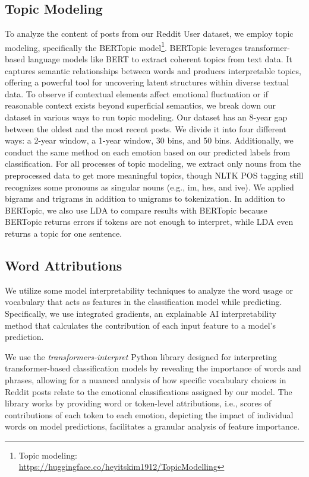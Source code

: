 \documentclass[conference,compsoc]{IEEEtran}
\begin{document}
\subsection{Topic Modeling}
To analyze the content of posts from our Reddit User dataset, we employ topic modeling, specifically the BERTopic model\footnote{Topic modeling: \\\url{https://huggingface.co/heyitskim1912/TopicModelling}}. BERTopic leverages transformer-based language models like BERT to extract coherent topics from text data. It captures semantic relationships between words and produces interpretable topics, offering a powerful tool for uncovering latent structures within diverse textual data. To observe if contextual elements affect emotional fluctuation or if reasonable context exists beyond superficial semantics, we break down our dataset in various ways to run topic modeling. Our dataset has an 8-year gap between the oldest and the most recent posts. We divide it into four different ways: a 2-year window, a 1-year window, 30 bins, and 50 bins. Additionally, we conduct the same method on each emotion based on our predicted labels from classification. For all processes of topic modeling, we extract only nouns from the preprocessed data to get more meaningful topics, though NLTK POS tagging still recognizes some pronouns as singular nouns (e.g., im, hes, and ive). We applied bigrams and trigrams in addition to unigrams to tokenization. In addition to BERTopic, we also use LDA to compare results with BERTopic because BERTopic returns errors if tokens are not enough to interpret, while LDA even returns a topic for one sentence. 

\subsection{Word Attributions}
We utilize some model interpretability techniques to analyze the word usage or vocabulary that acts as features in the classification model while predicting. Specifically, we use integrated gradients, an explainable AI interpretability method that calculates the contribution of each input feature to a model's prediction. 

We use the \textit{transformers-interpret} Python library designed for interpreting transformer-based classification models by revealing the importance of words and phrases, allowing for a nuanced analysis of how specific vocabulary choices in Reddit posts relate to the emotional classifications assigned by our model. The library works by providing word or token-level attributions, i.e., scores of contributions of each token to each emotion, depicting the impact of individual words on model predictions, facilitates a granular analysis of feature importance. 
\end{document}
